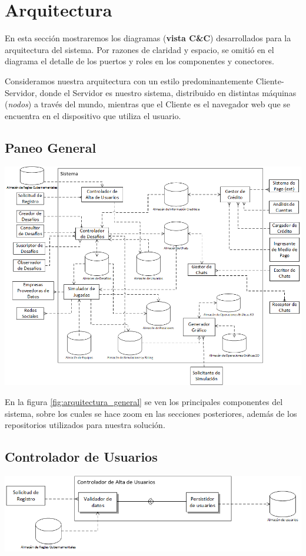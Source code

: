 \section{Arquitectura}
En esta sección mostraremos los diagramas (\textbf{vista C\&C}) desarrollados para la arquitectura del sistema. Por razones de claridad y espacio, se omitió en el diagrama el detalle de los puertos y roles en los componentes y conectores.

Consideramos nuestra arquitectura con un estilo predominantemente Cliente-Servidor, donde el Servidor es nuestro sistema, distribuido en distintas máquinas (\textit{nodos}) a través del mundo, mientras que el Cliente es el navegador web que se encuentra en el dispositivo que utiliza el usuario.

\subsection{Paneo General}
\includegraphics[scale=0.80,angle=90]{diagramas/arquitectura_general}
\label{fig:arquitectura_general}

En la figura \ref{fig:arquitectura_general} se ven los principales componentes del sistema, sobre los cuales se hace zoom en las secciones posteriores, además de los repositorios utilizados para nuestra solución.

\subsection{Controlador de Usuarios}
\includegraphics[scale=0.65]{diagramas/controlador_de_usuarios}
\label{fig:controlador_de_usuarios}

